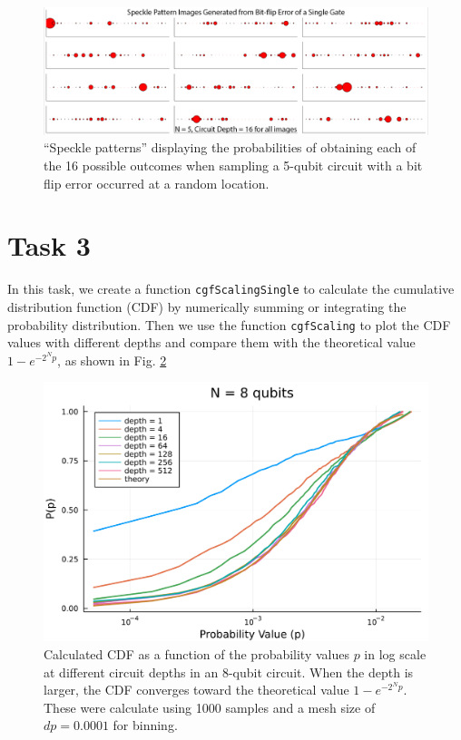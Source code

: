 \documentclass[12pt]{article}
\begin{document}
\begin{figure}[th]
	\centering
	\includegraphics [width=\linewidth] {figures/Task2}
	\caption{
		 ``Speckle patterns'' displaying the probabilities of obtaining each of the 16 possible outcomes when sampling a 5-qubit circuit with a bit flip error occurred at a random location.
	}
	\label{fig:bitflip}
\end{figure}

\section*{Task 3}

In this task, we create a function \texttt{cgfScalingSingle} to calculate the cumulative distribution function (CDF) by numerically summing or integrating the probability distribution. Then we use the function \texttt{cgfScaling} to plot the CDF values with different depths and compare them with the theoretical value $1-e^{-2^Np}$, as shown in Fig. \ref{fig:cdf}

\begin{figure}[t]
	\centering
	\includegraphics [width=0.8\linewidth] {figures/Task3}
	\caption{
		Calculated CDF as a function of the probability values $p$ in log scale at different circuit depths in an 8-qubit circuit. When the depth is larger, the CDF converges toward the theoretical value $1- e^{-2^Np}$. These were calculate using 1000 samples and a mesh size of $dp = 0.0001$ for binning.
	}
	\label{fig:cdf}
\end{figure}
\end{document}
